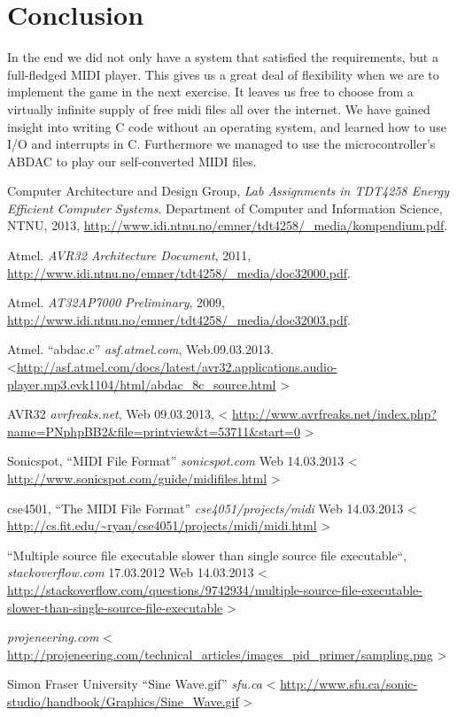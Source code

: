 \documentclass[a4paper,12pt]{article}
\begin{document}
\clearpage
\section{Conclusion}
In the end we did not only have a system that satisfied the requirements, but a full-fledged MIDI player. This gives us a great deal of flexibility when we are to implement the game in the next exercise. It leaves us free to choose from a virtually infinite supply of free midi files all over the internet.
We have gained insight into writing C code without an operating system, and learned how to use I/O and interrupts in C. Furthermore we managed to use the microcontroller’s ABDAC to play our self-converted MIDI files.

\clearpage

\begin{thebibliography}{9}

Computer Architecture and Design Group,
\emph{Lab Assignments in TDT4258 Energy Efficient Computer Systems}.
Department of Computer and Information Science, NTNU,
2013,
\url{http://www.idi.ntnu.no/emner/tdt4258/\_media/kompendium.pdf}.

Atmel.
\emph{AVR32 Architecture Document},
2011,
\url{http://www.idi.ntnu.no/emner/tdt4258/\_media/doc32000.pdf}.

Atmel.
\emph{AT32AP7000 Preliminary},
2009,
\url{http://www.idi.ntnu.no/emner/tdt4258/\_media/doc32003.pdf}.

Atmel. “abdac.c”
\emph{asf.atmel.com},
Web.09.03.2013.
\textless \url{http://asf.atmel.com/docs/latest/avr32.applications.audio-player.mp3.evk1104/html/abdac_8c_source.html}
\textgreater

AVR32
\emph{avrfreaks.net},
Web 09.03.2013,
\textless
\url{http://www.avrfreaks.net/index.php?name=PNphpBB2&file=printview&t=53711&start=0}
\textgreater

Sonicspot, “MIDI File Format”
\emph{sonicspot.com}
Web 14.03.2013
\textless
\url{http://www.sonicspot.com/guide/midifiles.html}
\textgreater

cse4501, “The MIDI File Format”
\emph{cse4051/projects/midi}
Web 14.03.2013
\textless
\url{http://cs.fit.edu/~ryan/cse4051/projects/midi/midi.html}
\textgreater




“Multiple source file executable slower than single source file executable“, 
\emph{stackoverflow.com}
17.03.2012 Web 14.03.2013
\textless
\url{http://stackoverflow.com/questions/9742934/multiple-source-file-executable-slower-than-single-source-file-executable}
\textgreater

\emph{projeneering.com}
\textless
\url{http://projeneering.com/technical_articles/images_pid_primer/sampling.png}
\textgreater

Simon Fraser University “Sine Wave.gif”
\emph{sfu.ca}
\textless
\url{http://www.sfu.ca/sonic-studio/handbook/Graphics/Sine_Wave.gif}
\textgreater
\end{thebibliography}
\end{document}
